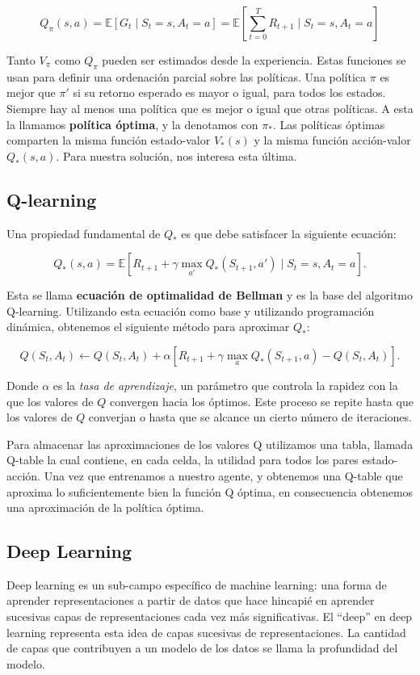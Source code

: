 \[
Q_{\pi}(s,a) = \mathbb{E} \left[ G_t \mid S_t = s, A_t = a \right] = \mathbb{E} \left[ \sum_{t=0}^{T} R_{t+1} \mid S_t = s, A_t = a \right]
\]

Tanto $V_{\pi}$ como $Q_{\pi}$ pueden ser estimados desde la experiencia. Estas funciones se usan para definir una ordenación parcial sobre las políticas. Una política $\pi$ es mejor que $\pi'$ si su retorno esperado es mayor o igual, para todos los estados. Siempre hay al menos una política que es mejor o igual que otras políticas. A esta la llamamos \textbf{política óptima}, y la denotamos con $\pi_{*}$. Las políticas óptimas comparten la misma función estado-valor $V_{*}(s)$ y la misma función acción-valor $Q_{*}(s,a)$. Para nuestra solución, nos interesa esta última.


\subsection{Q-learning}
Una propiedad fundamental de $Q_*$ es que debe satisfacer la siguiente ecuación:

\[
Q_* (s,a) = \mathbb{E} \left[ R_{t+1} + \gamma \max_{a'} Q_*(S_{t+1},a') \mid S_t = s, A_t = a \right].
\]

Esta se llama \textbf{ecuación de optimalidad de Bellman} y es la base del algoritmo Q-learning. Utilizando esta ecuación como base y utilizando programación dinámica, obtenemos el siguiente método para aproximar $Q_*$:

\[
Q(S_t, A_t) \leftarrow Q(S_t, A_t) + \alpha \left[ R_{t+1} + \gamma \max_{a} Q_*(S_{t+1},a) - Q(S_t, A_t) \right].
\]

Donde \(\alpha\) es la \textit{tasa de aprendizaje}, un parámetro que controla la rapidez con la que los valores de \(Q\) convergen hacia los óptimos. Este proceso se repite hasta que los valores de \(Q\) converjan o hasta que se alcance un cierto número de iteraciones.

Para almacenar las aproximaciones de los valores Q utilizamos una tabla, llamada Q-table la cual contiene, en cada celda, la utilidad para todos los pares estado-acción.  Una vez que entrenamos a nuestro agente, y obtenemos una Q-table que aproxima lo suficientemente bien la función Q óptima, en consecuencia obtenemos una aproximación de la política óptima.

\subsection{Deep Learning}
Deep learning es un sub-campo específico de machine learning: una forma de aprender representaciones a partir de datos que hace hincapié en aprender sucesivas capas de representaciones cada vez más significativas. El ``deep'' en deep learning representa esta idea de capas sucesivas de representaciones. La cantidad de capas que contribuyen a un modelo de los datos se llama la profundidad del modelo. 

